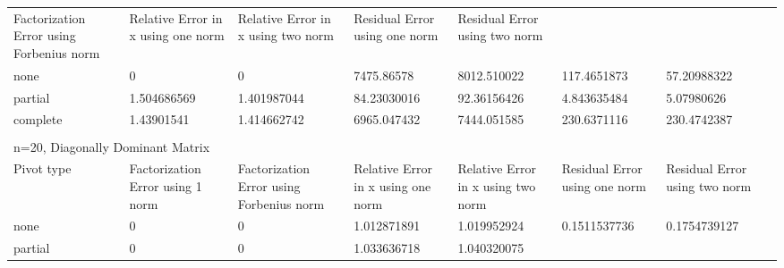 \documentclass[12pt, letterpaper]{article}
\begin{document}
\begin{table}[h]
{{\begin{tabular}{llllllll}
      \multicolumn{1}{l|}{Factorization Error using Forbenius norm} &
      \multicolumn{1}{l|}{Relative Error in x using one norm} &
      \multicolumn{1}{l|}{Relative Error in x using two norm} &
      \multicolumn{1}{l|}{Residual Error using one norm} &
      \multicolumn{1}{l|}{Residual Error using two norm} &
       \\ \cline{1-7}
    \multicolumn{1}{|l|}{none} &
      \multicolumn{1}{l|}{0} &
      \multicolumn{1}{l|}{0} &
      \multicolumn{1}{l|}{7475.86578} &
      \multicolumn{1}{l|}{8012.510022} &
      \multicolumn{1}{l|}{117.4651873} &
      \multicolumn{1}{l|}{57.20988322} &
       \\ \cline{1-7}
    \multicolumn{1}{|l|}{partial} &
      \multicolumn{1}{l|}{1.504686569} &
      \multicolumn{1}{l|}{1.401987044} &
      \multicolumn{1}{l|}{84.23030016} &
      \multicolumn{1}{l|}{92.36156426} &
      \multicolumn{1}{l|}{4.843635484} &
      \multicolumn{1}{l|}{5.07980626} &
       \\ \cline{1-7}
    \multicolumn{1}{|l|}{complete} &
      \multicolumn{1}{l|}{1.43901541} &
      \multicolumn{1}{l|}{1.414662742} &
      \multicolumn{1}{l|}{6965.047432} &
      \multicolumn{1}{l|}{7444.051585} &
      \multicolumn{1}{l|}{230.6371116} &
      \multicolumn{1}{l|}{230.4742387} &
       \\ \cline{1-7}
     &
       &
       &
       &
       &
       &
       &
       \\ \cline{1-7}
    \multicolumn{7}{|l|}{n=20, Diagonally Dominant Matrix} &
       \\ \cline{1-7}
    \multicolumn{1}{|l|}{Pivot type} &
      \multicolumn{1}{l|}{Factorization Error using 1 norm} &
      \multicolumn{1}{l|}{Factorization Error using Forbenius norm} &
      \multicolumn{1}{l|}{Relative Error in x using one norm} &
      \multicolumn{1}{l|}{Relative Error in x using two norm} &
      \multicolumn{1}{l|}{Residual Error using one norm} &
      \multicolumn{1}{l|}{Residual Error using two norm} &
       \\ \cline{1-7}
    \multicolumn{1}{|l|}{none} &
      \multicolumn{1}{l|}{0} &
      \multicolumn{1}{l|}{0} &
      \multicolumn{1}{l|}{1.012871891} &
      \multicolumn{1}{l|}{1.019952924} &
      \multicolumn{1}{l|}{0.1511537736} &
      \multicolumn{1}{l|}{0.1754739127} &
       \\ \cline{1-7}
    \multicolumn{1}{|l|}{partial} &
      \multicolumn{1}{l|}{0} &
      \multicolumn{1}{l|}{0} &
      \multicolumn{1}{l|}{1.033636718} &
      \multicolumn{1}{l|}{1.040320075} &

\end{tabular}}}
\end{table}
\end{document}
